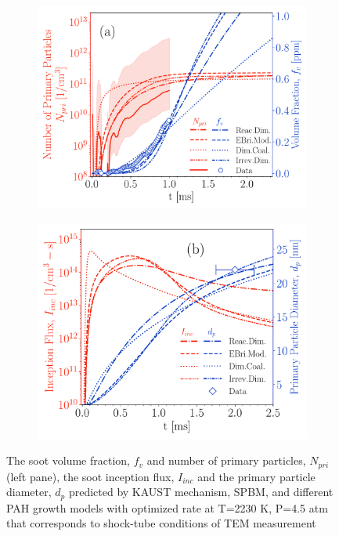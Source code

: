 \begin{figure}[H]
	\centering
	\begin{subfigure}[t]{0.42\textwidth}
		\includegraphics[width=1\textwidth]{Figures/Results/Shocktube/Stanford/TEM/10CH4_TEM_Nprivf_opt.pdf}
	\end{subfigure}
	\begin{subfigure}[t]{0.39\textwidth}
		\includegraphics[width=1\textwidth]{Figures/Results/Shocktube/Stanford/TEM/10CH4_TEM_Iincdp_opt.pdf}
	\end{subfigure}
	\caption{The soot volume fraction, $f_v$ and number of primary particles, $N_{pri}$ (left pane), the soot inception flux, $I_{inc}$ and the primary particle diameter, $d_p$ predicted by KAUST mechanism, SPBM, and different PAH growth models with optimized rate at T=2230 K, P=4.5 atm that corresponds to shock-tube conditions of TEM measurement}
	\label{fig:shocktube_TEM_10ch4_fvNpriIincdp_opt} 
\end{figure}


